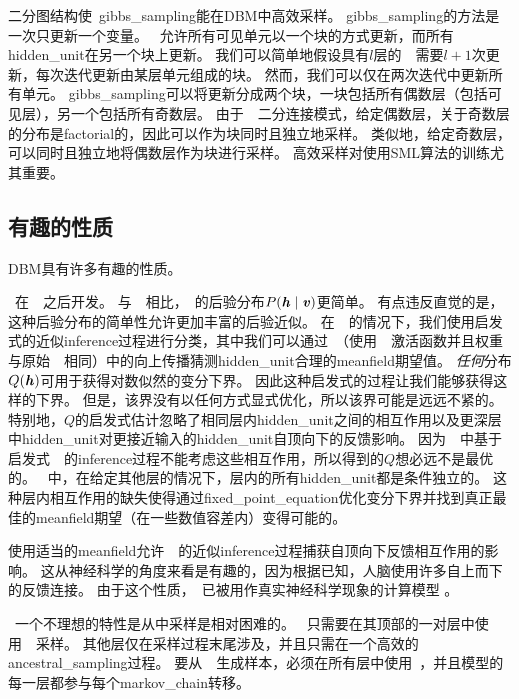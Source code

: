 
二分图结构使~\gls{gibbs_sampling}能在\gls{DBM}中高效采样。
\gls{gibbs_sampling}的方法是一次只更新一个变量。
~允许所有可见单元以一个块的方式更新，而所有\gls{hidden_unit}在另一个块上更新。
我们可以简单地假设具有$l$层的~~需要$l+1$次更新，每次迭代更新由某层单元组成的块。
然而，我们可以仅在两次迭代中更新所有单元。
\gls{gibbs_sampling}可以将更新分成两个块，一块包括所有偶数层（包括可见层），另一个包括所有奇数层。
由于~~二分连接模式，给定偶数层，关于奇数层的分布是\gls{factorial}的，因此可以作为块同时且独立地采样。
类似地，给定奇数层，可以同时且独立地将偶数层作为块进行采样。
高效采样对使用\gls{SML}算法的训练尤其重要。


\subsection{有趣的性质}
\gls{DBM}具有许多有趣的性质。

~在~~之后开发。
与~~相比，~的后验分布$P(\boldsymbol{\mathit{h}}  \mid  \boldsymbol{\mathit{v}})$更简单。
有点违反直觉的是，这种后验分布的简单性允许更加丰富的后验近似。
在~~的情况下，我们使用启发式的近似\gls{inference}过程进行分类，其中我们可以通过~（使用~~激活函数并且权重与原始~~相同）中的向上传播猜测\gls{hidden_unit}合理的\gls{meanfield}期望值。
\emph{任何}分布$Q(\boldsymbol{\mathit{h}})$可用于获得对数似然的变分下界。
因此这种启发式的过程让我们能够获得这样的下界。
但是，该界没有以任何方式显式优化，所以该界可能是远远不紧的。
特别地，$Q$的启发式估计忽略了相同层内\gls{hidden_unit}之间的相互作用以及更深层中\gls{hidden_unit}对更接近输入的\gls{hidden_unit}自顶向下的反馈影响。
因为~~中基于启发式~~的\gls{inference}过程不能考虑这些相互作用，所以得到的$Q$想必远不是最优的。
~中，在给定其他层的情况下，层内的所有\gls{hidden_unit}都是条件独立的。
这种层内相互作用的缺失使得通过\gls{fixed_point_equation}优化变分下界并找到真正最佳的\gls{meanfield}期望（在一些数值容差内）变得可能的。


使用适当的\gls{meanfield}允许~~的近似\gls{inference}过程捕获自顶向下反馈相互作用的影响。
这从神经科学的角度来看是有趣的，因为根据已知，人脑使用许多自上而下的反馈连接。
由于这个性质，~已被用作真实神经科学现象的计算模型 \citep{series2010hallucinations,reichert2011neuronal}。


~一个不理想的特性是从中采样是相对困难的。 
~只需要在其顶部的一对层中使用~~采样。
其他层仅在采样过程末尾涉及，并且只需在一个高效的\gls{ancestral_sampling}过程。
要从~~生成样本，必须在所有层中使用~，并且模型的每一层都参与每个\gls{markov_chain}转移。


